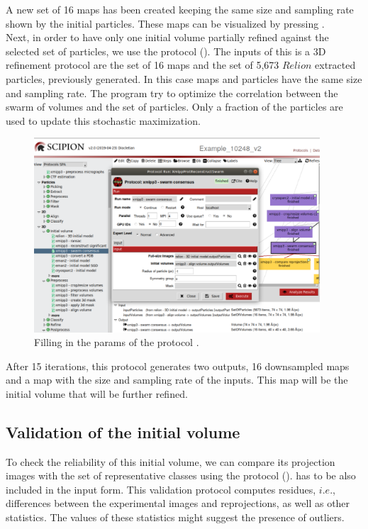 A new set of 16 maps has been created keeping the same size and sampling rate shown by the initial particles. These maps can be visualized by pressing .\\

Next, in order to have only one initial volume partially refined against the selected set of particles, we use the protocol  (). The inputs of this is a 3D refinement protocol are the set of 16 maps and the set of 5,673 $Relion$ extracted particles, previously generated. In this case maps and particles have the same size and sampling rate. The program try to optimize the correlation between the swarm of volumes and the set of particles. Only a fraction of the particles are used to update this stochastic maximization.

\begin{figure}[H]
  \centering
  \captionsetup{width=.8\linewidth} 
  \includegraphics[width=0.95\textwidth]
  {images/swarn_consensus.pdf}
  \caption{Filling in the params of the protocol .}
  \label{fig:swarn_consensus}
  \end{figure}
  
After 15 iterations, this protocol generates two outputs, 16 downsampled maps and a map with the size and sampling rate of the inputs. This map will be the initial volume that will be further refined.\\

\subsection*{Validation of the initial volume}
To check the reliability of this initial volume, we can compare its projection images with the set of representative  classes using the protocol  ().  has to be also included in the input form. This  validation protocol computes residues, $i.e.$, differences between the experimental images and reprojections, as well as other statistics. The values of these statistics might suggest the presence of outliers.


